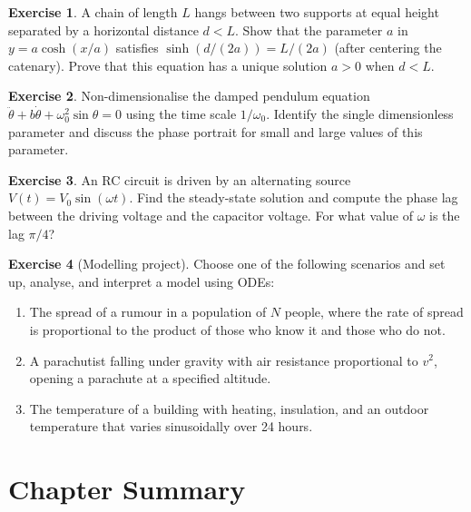 \documentclass[12pt,a4paper,openany]{book}
\theoremstyle{definition}
\newtheorem{exercise}{Exercise}[chapter]
\theoremstyle{plain}
\theoremstyle{remark}
\begin{document}
\begin{exercise}
\label{exer:catenary-BC}
A chain of length $L$ hangs between two supports at equal height
separated by a horizontal distance $d<L$. Show that the parameter
$a$ in $y=a\cosh(x/a)$ satisfies $\sinh(d/(2a))=L/(2a)$ (after
centering the catenary). Prove that this equation has a unique
solution $a>0$ when $d<L$.
\end{exercise}

\begin{exercise}
\label{exer:nondim-exercise}
Non-dimensionalise the damped pendulum equation
$\ddot{\theta}+b\dot{\theta}+\omega_{0}^{2}\sin\theta=0$ using the
time scale $1/\omega_{0}$. Identify the single dimensionless
parameter and discuss the phase portrait for small and large values
of this parameter.
\end{exercise}

\begin{exercise}
\label{exer:rc-ac}
An RC circuit is driven by an alternating source
$V(t)=V_{0}\sin(\omega t)$. Find the steady-state solution and
compute the phase lag between the driving voltage and the capacitor
voltage. For what value of $\omega$ is the lag $\pi/4$?
\end{exercise}

\begin{exercise}[Modelling project]
\label{exer:modelling-project}
Choose one of the following scenarios and set up, analyse, and
interpret a model using ODEs:
\begin{enumerate}[label=(\alph*)]
  \item The spread of a rumour in a population of $N$ people, where
    the rate of spread is proportional to the product of those who
    know it and those who do not.
  \item A parachutist falling under gravity with air resistance
    proportional to $v^{2}$, opening a parachute at a specified
    altitude.
  \item The temperature of a building with heating, insulation, and
    an outdoor temperature that varies sinusoidally over 24 hours.
\end{enumerate}
\end{exercise}

\section*{Chapter Summary}
\end{document}
